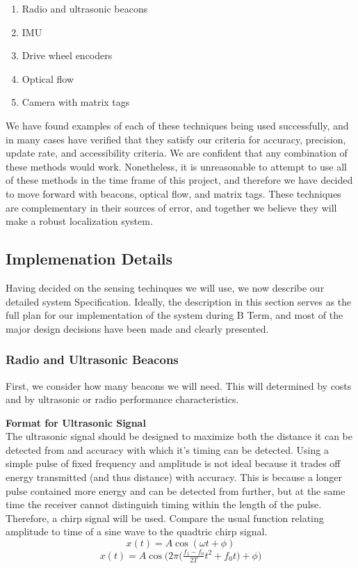\documentclass{article}
\begin{document}
\begin{enumerate}
    \item Radio and ultrasonic beacons
    \item IMU
    \item Drive wheel encoders
    \item Optical flow
    \item Camera with matrix tags
\end{enumerate}

We have found examples of each of these techniques being used successfully, and in many cases have verified that they satisfy our criteria for accuracy, precision, update rate, and accessibility criteria. We are confident that any combination of these methods would work. Nonetheless, it is unreasonable to attempt to use all of these methods in the time frame of this project, and therefore we have decided to move forward with beacons, optical flow, and matrix tags. These techniques are complementary in their sources of error, and together we believe they will make a robust localization system.

\subsection{Implemenation Details}
Having decided on the sensing techinques we will use, we now describe our detailed system Specification. Ideally, the description in this section serves as the full plan for our implementation of the system during B Term, and most of the major design decisions have been made and clearly presented.

\subsubsection{Radio and Ultrasonic Beacons}

First, we consider how many beacons we will need. This will determined by costs and by ultrasonic or radio performance characteristics.

\textbf{Format for Ultrasonic Signal} \\
The ultrasonic signal should be designed to maximize both the distance it can be detected from and accuracy with which it's timing can be detected. Using a simple pulse of fixed frequency and amplitude is not ideal because it trades off energy transmitted (and thus distance) with accuracy. This is because a longer pulse contained more energy and can be detected from further, but at the same time the receiver cannot distinguish timing within the length of the pulse. Therefore, a chirp signal will be used. Compare the usual function relating amplitude to time of a sine wave to the quadtric chirp signal.
$$ x(t) = A\cos(\omega t + \phi) $$
$$ x(t) = A\cos\bigg(2\pi\Big(\tfrac{f_1 - f_0}{2T}t^2+f_0t\Big) + \phi\bigg) $$
\end{document}
